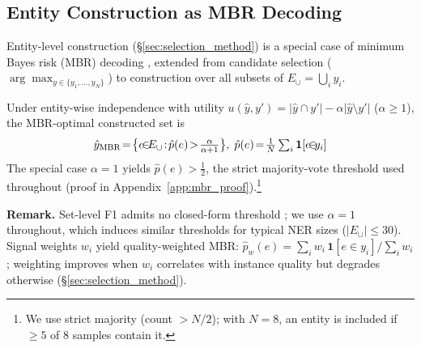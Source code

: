 \subsection{Entity Construction as MBR Decoding}\label{sec:mbr_theory}

Entity-level construction (\S\ref{sec:selection_method}) is a special case of minimum Bayes risk (MBR) decoding \cite{kumar2004minimum, eikema2020map}, extended from candidate selection ($\arg\max_{y \in \{y_1,\ldots,y_N\}}$) to construction over all subsets of $E_\cup{=}\bigcup_i y_i$.

\begin{proposition}\label{prop:construction_mbr}
Under entity-wise independence with utility $u(\hat{y}, y') = |\hat{y} \cap y'| - \alpha|\hat{y} \setminus y'|$ ($\alpha \geq 1$), the MBR-optimal constructed set is
\begin{equation}\label{eq:mbr_construction}
\hat{y}_{\textup{MBR}} \!=\! \bigl\{e \!{\in}\! E_\cup \!:\! \hat{p}(e) \!>\! \tfrac{\alpha}{\alpha{+}1}\bigr\},\; \hat{p}(e) \!=\! \tfrac{1}{N} \textstyle\sum\nolimits_{i} \mathbf{1}[e \!{\in}\! y_i]
\end{equation}
The special case $\alpha{=}1$ yields $\hat{p}(e) > \tfrac{1}{2}$, the strict majority-vote threshold used throughout (proof in Appendix~\ref{app:mbr_proof}).\footnote{We use strict majority (count $> N/2$); with $N{=}8$, an entity is included if ${\geq}5$ of 8 samples contain it.}
\end{proposition}

\noindent\textbf{Remark.}
Set-level F1 admits no closed-form threshold \cite{dembczynski2011exact}; we use $\alpha{=}1$ throughout, which induces similar thresholds for typical NER sizes ($|E_\cup| \leq 30$).
Signal weights $w_i$ yield quality-weighted MBR: $\hat{p}_w(e) = \sum_{i} w_i \, \mathbf{1}[e {\in} y_i] / \sum_{i} w_i$; weighting improves when $w_i$ correlates with instance quality but degrades otherwise (\S\ref{sec:selection_method}).
